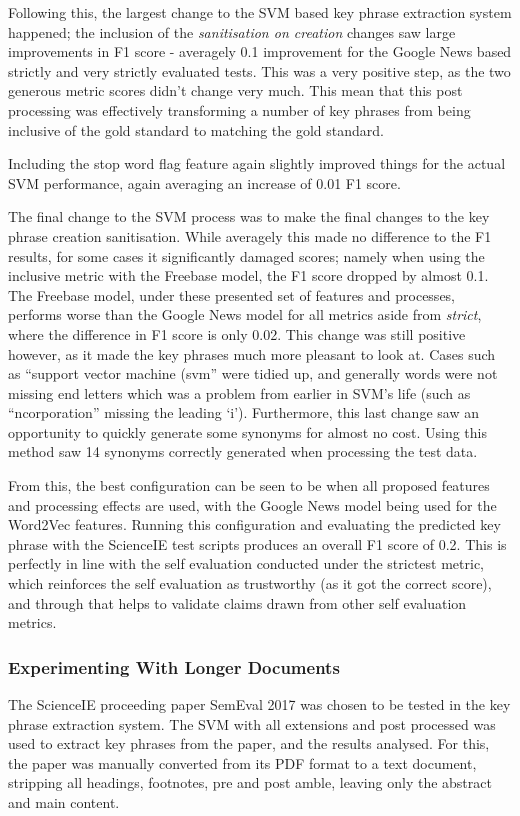 Following this, the largest change to the SVM based key phrase extraction system happened; the inclusion of the \textit{sanitisation on creation} changes saw large improvements in F1 score - averagely 0.1 improvement for the Google News based strictly and very strictly evaluated tests. This was a very positive step, as the two generous metric scores didn't change very much. This mean that this post processing was effectively transforming a number of key phrases from being inclusive of the gold standard to matching the gold standard. 

Including the stop word flag feature again slightly improved things for the actual SVM performance, again averaging an increase of 0.01 F1 score.

The final change to the SVM process was to make the final changes to the key phrase creation sanitisation. While averagely this made no difference to the F1 results, for some cases it significantly damaged scores; namely when using the inclusive metric with the Freebase model, the F1 score dropped by almost 0.1. The Freebase model, under these presented set of features and processes, performs worse than the Google News model for all metrics aside from \textit{strict}, where the difference in F1 score is only 0.02. This change was still positive however, as it made the key phrases much more pleasant to look at. Cases such as ``support vector machine (svm'' were tidied up, and generally words were not missing end letters which was a problem from earlier in SVM's life (such as ``ncorporation'' missing the leading `i'). Furthermore, this last change saw an opportunity to quickly generate some synonyms for almost no cost. Using this method saw 14 synonyms correctly generated when processing the test data. 

From this, the best configuration can be seen to be when all proposed features and processing effects are used, with the Google News model being used for the Word2Vec features. Running this configuration and evaluating the predicted key phrase with the ScienceIE test scripts produces an overall F1 score of 0.2. This is perfectly in line with the self evaluation conducted under the strictest metric, which reinforces the self evaluation as trustworthy (as it got the correct score), and through that helps to validate claims drawn from other self evaluation metrics. 

\subsubsection{Experimenting With Longer Documents}
The ScienceIE proceeding paper SemEval 2017 \cite{Augenstein2017} was chosen to be tested in the key phrase extraction system. The SVM with all extensions and post processed was used to extract key phrases from the paper, and the results analysed. For this, the paper was manually converted from its PDF format to a text document, stripping all headings, footnotes, pre and post amble, leaving only the abstract and main content.


